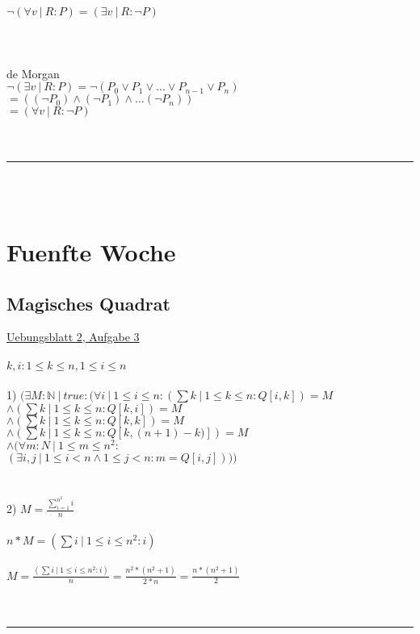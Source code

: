 \documentclass[18pt,a4paper]{article}
\newcommand{\tab}{\hspace*{2em}}
\begin{document}
$\neg (\forall{v} \:\vert\: R : P) = (\exists{v} \:\vert\: R : \neg P)$\\
\\
\\
\\
de Morgan\\
$\neg (\exists{v} \:\vert\: R : P) = \neg (P_0 \vee P_1 \vee ... \vee P_{n-1} \vee P_n) $\\
\tab \tab \tab $= ((\neg P_0) \wedge (\neg P_1) \wedge ... (\neg P_n))$\\
\tab \tab \tab $= (\forall{v} \:\vert\: R : \neg P)$\\
\\
\\
\rule{\textwidth}{0.4mm}\\
\\

\section{Fuenfte Woche}

\subsection{Magisches Quadrat}

\uline{Uebungsblatt 2, Aufgabe 3}\\
\\
$k,i: 1\leqslant k\leqslant n, 1\leqslant i\leqslant n$\\
\\
1) $(\exists{M} : \mathbb{N} \:\vert\: true : (\forall{i} \:\vert\: 1\leqslant i\leqslant n :(\sum{k} \:\vert\: 1\leqslant k\leqslant n : Q[i,k]) = M $\\
\tab\tab\tab\tab\tab\tab\tab $\wedge (\sum{k} \:\vert\: 1\leqslant k\leqslant n : Q[k,i]) = M$ \\
\tab\tab\tab\tab\tab\tab\tab $\wedge (\sum{k} \:\vert\: 1\leqslant k\leqslant n : Q[k,k]) = M$ \\
\tab\tab\tab\tab\tab\tab\tab $\wedge (\sum{k} \:\vert\: 1\leqslant k\leqslant n : Q[k,(n+1)-k)]) = M$\\
\tab\tab\tab\tab\tab\tab\tab $\wedge (\forall{m} : N \:\vert\: 1\leqslant m\leqslant n^2 :$\\
\tab\tab\tab\tab\tab\tab\tab\tab $(\exists{i,j} \:\vert\: 1\leqslant i < n\wedge 1\leqslant j < n: m = Q[i,j])))$ \\
\\
\\
2) $M = \frac{\sum_{i=1}^{n^2}i}{n}$\\
\\
$n * M = (\sum{i} \:\vert\: 1\leqslant i\leqslant n^2 : i )$\\
\\
$M = \frac{(\sum{i} \:\vert\: 1\leqslant i\leqslant n^2 : i )}{n} = \frac{n^2 * (n^2 + 1)}{2*n} = \frac{n * (n^2 + 1)}{2}$\\
\\
\\
\rule{\textwidth}{0.4mm}\\
\\
\end{document}
